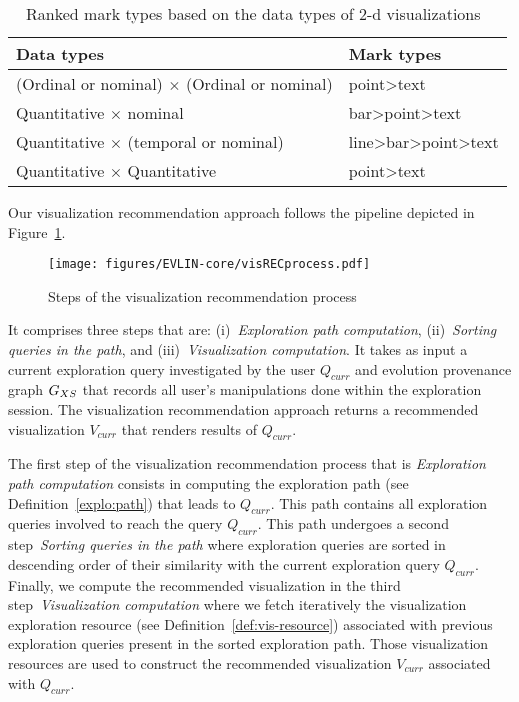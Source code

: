  \begin{table}[t]
\centering
\scriptsize
 \begin{tabu}{|p{5cm}|p{2.7cm}|} \hline
\textbf{Data types} & \textbf{Mark types} \\ \hline
 (Ordinal or nominal) $\times$  (Ordinal or nominal) &point>text  \\ \hline 
 Quantitative $\times$  nominal &bar>point>text \\ \hline
  Quantitative $\times$ (temporal or nominal) &line>bar>point>text \\ \hline
  Quantitative $\times$   Quantitative & point>text \\ 
 \hline
\end{tabu}
\caption{Ranked mark types based on the data types of 2-d visualizations~\cite{Wongsuphasawat2016} }
\label{tab:permittedMarks}
\end{table}


Our visualization recommendation approach follows the pipeline depicted in Figure~\ref{fig:vis-rec-process}. 

\begin{figure}[t]
\centering
\texttt{[image: figures/EVLIN-core/visRECprocess.pdf]}
\caption{Steps of the visualization recommendation process}
\label{fig:vis-rec-process}
\end{figure}

It comprises three steps that are: (i)~\emph{Exploration path computation}, (ii)~\emph{Sorting queries in the path}, and (iii)~\emph{Visualization computation}. It takes as input a current exploration query investigated by the user $Q_{curr}$ and evolution provenance graph $G_{XS}$ that records all user's manipulations done within the exploration session. The visualization recommendation approach returns a recommended visualization $V_{curr}$ that renders results of $Q_{curr}$.

The first step of the visualization recommendation process that is \emph{Exploration path computation} consists in computing the exploration path (see Definition~\ref{explo:path}) that leads to $Q_{curr}$.
This path contains all exploration queries involved to reach the query $Q_{curr}$. 
This path undergoes a second step~\emph{Sorting queries in the path} where exploration queries are sorted in descending order of their similarity with the current exploration query $Q_{curr}$.
Finally, we compute the recommended visualization in the third step~\emph{Visualization computation} where  we fetch iteratively the visualization exploration resource (see Definition~\ref{def:vis-resource}) associated with previous exploration queries present in the sorted exploration path. Those visualization resources are used to construct the recommended visualization $V_{curr}$ associated with $Q_{curr}$.

